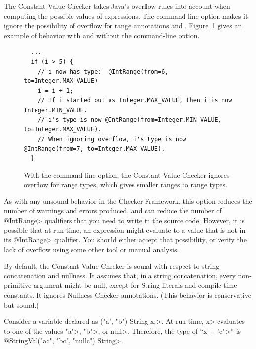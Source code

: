 
The Constant Value Checker takes Java's overflow rules into account when
computing the possible values of expressions.
%
The  command-line option makes it ignore the
possibility of overflow for range annotations
 and
.
%
Figure~\ref{fig-value-ignore-overflow} gives an example of behavior with
and without the  command-line option.

\begin{figure}
\begin{Verbatim}
  ...
  if (i > 5) {
    // i now has type:  @IntRange(from=6, to=Integer.MAX_VALUE)
    i = i + 1;
    // If i started out as Integer.MAX_VALUE, then i is now Integer.MIN_VALUE.
    // i's type is now @IntRange(from=Integer.MIN_VALUE, to=Integer.MAX_VALUE).
    // When ignoring overflow, i's type is now @IntRange(from=7, to=Integer.MAX_VALUE).
  }
\end{Verbatim}
\caption{With the  command-line option,
the Constant Value Checker ignores overflow
for range types, which gives smaller ranges to range types.}
\label{fig-value-ignore-overflow}
\end{figure}

As with any unsound behavior in the Checker Framework, this option reduces
the number of warnings and errors produced, and can reduce the number of
\<@IntRange> qualifiers that you need to write in the source code.
However, it is possible that at run time, an expression might evaluate to a
value that is not in its \<@IntRange> qualifier.  You should either accept
that possibility, or verify the lack of overflow using some other tool or
manual analysis.



By default, the Constant Value Checker is sound with respect to string
concatenation and nullness.  It assumes that, in a string concatenation,
every non-primitive argument might be null, except for String literals
and compile-time constants. It ignores Nullness Checker annotations.
(This behavior is conservative but sound.)

Consider a variable declared as
\<("a", "b") String x;>.
At run time, \<x> evaluates to one of the values \<"a">, \<"b">, or
\<null>.
Therefore, the type of ``\<x + "c">'' is
\<@StringVal("ac", "bc", "nullc") String>.

